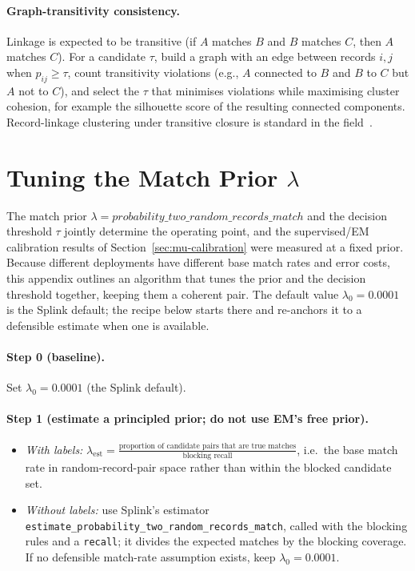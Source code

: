 \documentclass[11pt]{article}
\begin{document}
\paragraph{Graph-transitivity consistency.} Linkage is expected to be transitive (if $A$ matches $B$ and $B$ matches $C$, then $A$ matches $C$). For a candidate $\tau$, build a graph with an edge between records $i,j$ when $p_{ij}\ge \tau$, count transitivity violations (e.g., $A$ connected to $B$ and $B$ to $C$ but $A$ not to $C$), and select the $\tau$ that minimises violations while maximising cluster cohesion, for example the silhouette score of the resulting connected components. Record-linkage clustering under transitive closure is standard in the field~\cite{christen2012}.

\section{Tuning the Match Prior $\lambda$}
\label{app:tune-prior}
The match prior $\lambda=\mathit{probability\_two\_random\_records\_match}$ and the decision threshold $\tau$ jointly determine the operating point, and the supervised/EM calibration results of Section~\ref{sec:mu-calibration} were measured at a fixed prior. Because different deployments have different base match rates and error costs, this appendix outlines an algorithm that tunes the prior and the decision threshold together, keeping them a coherent pair. The default value $\lambda_0=0.0001$ is the Splink default; the recipe below starts there and re-anchors it to a defensible estimate when one is available.

\paragraph{Step 0 (baseline).} Set $\lambda_0 = 0.0001$ (the Splink default).

\paragraph{Step 1 (estimate a principled prior; do not use EM's free prior).}
\begin{itemize}
  \item \emph{With labels:} $\lambda_\mathrm{est}=\tfrac{\text{proportion of candidate pairs that are true matches}}{\text{blocking recall}}$, i.e.\ the base match rate in random-record-pair space rather than within the blocked candidate set.
  \item \emph{Without labels:} use Splink's estimator {\footnotesize\texttt{estimate\_probability\_two\_random\_records\_match}}, called with the blocking rules and a \texttt{recall}; it divides the expected matches by the blocking coverage. If no defensible match-rate assumption exists, keep $\lambda_0 = 0.0001$.
\end{itemize}
\end{document}
